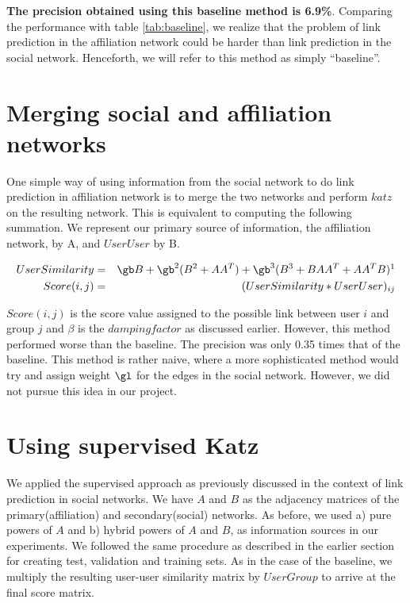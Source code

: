 \documentclass{report}
\begin{document}
\textbf{The precision obtained using this baseline method is 6.9\%}. Comparing the performance with table \ref{tab:baseline}, we realize that the problem of link prediction in the affiliation network could be harder than link prediction in the social network. Henceforth, we will refer to this method as simply ``baseline''.

\section{Merging social and affiliation networks}
One simple way of using information from the social network to do link prediction in affiliation network is to merge the two networks and perform $katz$ on the resulting network. This is equivalent to computing the following summation. We represent our primary source of information, the affiliation network, by A, and $UserUser$ by B.

\begin{eqnarray*}
UserSimilarity & = & \gb B + \gb^2(B^2 + AA^T) + \gb^3 (B^3 + BAA^T + A A^TB)\footnotemark\\
Score(i,j) & = & (UserSimilarity*UserUser)_{ij}
\end{eqnarray*}


$Score(i,j)$ is the score value assigned to the possible link between user $i$ and group $j$ and $\beta$ is the $damping factor$ as discussed earlier. However, this method performed worse than the baseline. The precision was only 0.35 times that of the baseline. This method is rather naive, where a more sophisticated method would try and assign weight $\gl$ for the edges in the social network. However, we did not pursue this idea in our project.

\section{Using supervised Katz}
We applied the supervised approach as previously discussed in the context of link prediction in social networks. We have $A$ and $B$ as the adjacency matrices of the primary(affiliation) and secondary(social) networks. As before, we used a) pure powers of $A$ and b) hybrid powers of $A$ and $B$, as information sources in our experiments. We followed the same procedure as described in the earlier section for creating test, validation and training sets. As in the case of the baseline, we multiply the resulting user-user similarity matrix by $UserGroup$ to arrive at the final score matrix. 
\end{document}
